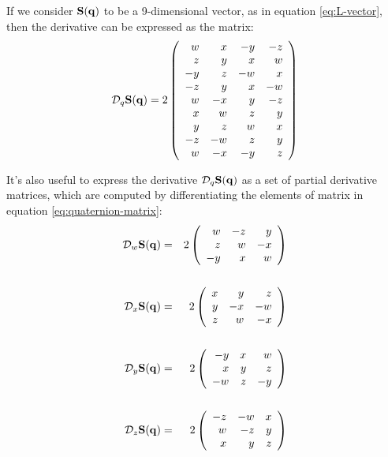 If we consider ${\mathbf S}({\mathbf q})$ to be a 9-dimensional vector,
as in equation \ref{eq:L-vector},
then the derivative can be expressed as the matrix:
\begin{equation}
\label{eq:quaternion-derivative-matrix}
{\mathcal D}_{q}{{\mathbf S}({\mathbf q})}
 = 2 \left(
\begin{array}{rrrr}
  w &  x & -y & -z \\
  z &  y &  x &  w \\
 -y &  z & -w &  x \\
 -z &  y &  x & -w \\
  w & -x &  y & -z \\
  x &  w &  z &  y \\
  y &  z &  w &  x \\
 -z & -w &  z &  y \\
  w & -x & -y &  z \\
\end{array}
\right)
\end{equation}

It's also useful to express the derivative ${\mathcal D}_{q}{{\mathbf S}({\mathbf q})}$
as a set of partial derivative matrices,
which are computed
by differentiating the elements of matrix in equation
\ref{eq:quaternion-matrix}:
\begin{eqnarray}
\label{eq:quaternion-matrix-partial-derivatives}
{\mathcal D}_{w}{{\mathbf S}({\mathbf q})}
& = &
2 \left(
\begin{array}{rrr}
 w & -z &  y \\
 z &  w & -x \\
-y &  x &  w
\end{array}
\right)
\\
\nonumber
\\
{\mathcal D}_{x}{{\mathbf S}({\mathbf q})}
& = &
2 \left(
\begin{array}{rrr}
 x &  y &  z \\
 y & -x & -w \\
 z &  w & -x
\end{array}
\right)
\nonumber
\\
\nonumber
\\
{\mathcal D}_{y}{{\mathbf S}({\mathbf q})}
& = &
2 \left(
\begin{array}{rrr}
-y &  x &  w \\
 x &  y &  z \\
-w &  z & -y
\end{array}
\right)
\nonumber
\\
\nonumber
\\
{\mathcal D}_{z}{{\mathbf S}({\mathbf q})}
& = &
2 \left(
\begin{array}{rrr}
-z & -w &  x \\
 w & -z &  y \\
 x &  y &  z
\end{array}
\right)
\nonumber
\end{eqnarray}

